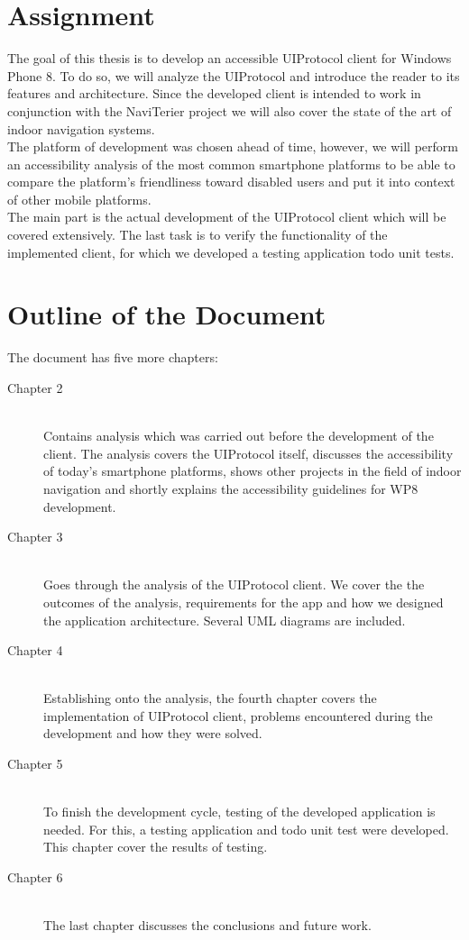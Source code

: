 \section{Assignment}
The goal of this thesis is to develop an accessible UIProtocol client for Windows Phone 8. To do so, we will analyze the UIProtocol and introduce the reader to its features and architecture. Since the developed client is intended to work in conjunction with the NaviTerier project we will also cover the state of the art of indoor navigation systems.\\The platform of development was chosen ahead of time, however, we will perform an accessibility analysis of the most common smartphone platforms to be able to compare the platform's friendliness toward disabled users and put it into context of other mobile platforms.\\The main part is the actual development of the UIProtocol client which will be covered extensively. The last task is to verify the functionality of the implemented client, for which we developed a testing application todo unit tests.

\section{Outline of the Document}
The document has five more chapters:

\begin{description}
  \item[Chapter 2] \hfill \\
  Contains analysis which was carried out before the development of the client. The analysis covers the UIProtocol itself, discusses the accessibility of today's smartphone platforms, shows other projects in the field of indoor navigation and shortly explains the accessibility guidelines for WP8 development.
  \item[Chapter 3] \hfill \\
  Goes through the analysis of the UIProtocol client. We cover the the outcomes of the analysis, requirements for the app and how we designed the application architecture. Several UML diagrams are included.
  \item[Chapter 4] \hfill \\
  Establishing onto the analysis, the fourth chapter covers the implementation of UIProtocol client, problems encountered during the development and how they were solved.
  \item[Chapter 5] \hfill \\
  To finish the development cycle, testing of the developed application is needed. For this, a testing application and todo unit test were developed. This chapter cover the results of testing.
    \item[Chapter 6] \hfill \\
    The last chapter discusses the conclusions and future work.
\end{description}
